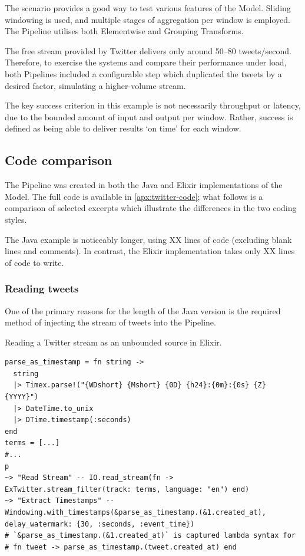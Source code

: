 The scenario provides a good way to test various features of the Model.
Sliding windowing is used, and multiple stages of aggregation per window is employed.
The Pipeline utilises both Elementwise and Grouping Transforms.

The free stream provided by Twitter delivers only around 50--80 tweets/second.
Therefore, to exercise the systems and compare their performance under load, both Pipelines included a configurable step which duplicated the tweets by a desired factor, simulating a higher-volume stream.

The key success criterion in this example is not necessarily throughput or latency, due to the bounded amount of input and output per window.
Rather, success is defined as being able to deliver results `on time' for each window.

\subsection{Code comparison}\label{sec:eval:code}

The Pipeline was created in both the Java and Elixir implementations of the Model.
The full code is available in \cref{apx:twitter-code}; what follows is a comparison of selected excerpts which illustrate the differences in the two coding styles.

The Java example is noticeably longer, using XX lines of code (excluding blank lines and comments).
In contrast, the Elixir implementation takes only XX lines of code to write.

\subsubsection{Reading tweets}

One of the primary reasons for the length of the Java version is the required method of injecting the stream of tweets into the Pipeline.

\begin{codelisting}
	\caption{Reading a Twitter stream as an unbounded source in Elixir.}
	\label{lst:eval:twitter-readstream-elixir}
	\begin{verbatim}
parse_as_timestamp = fn string ->
  string
  |> Timex.parse!("{WDshort} {Mshort} {0D} {h24}:{0m}:{0s} {Z} {YYYY}")
  |> DateTime.to_unix
  |> DTime.timestamp(:seconds)
end
terms = [...]
#...
p
~> "Read Stream" -- IO.read_stream(fn -> ExTwitter.stream_filter(track: terms, language: "en") end)
~> "Extract Timestamps" -- Windowing.with_timestamps(&parse_as_timestamp.(&1.created_at), delay_watermark: {30, :seconds, :event_time})
# `&parse_as_timestamp.(&1.created_at)` is captured lambda syntax for
# fn tweet -> parse_as_timestamp.(tweet.created_at) end
	\end{verbatim}
\end{codelisting}

